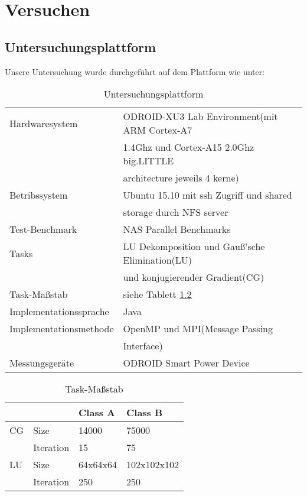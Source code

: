 \chapter{Versuchen}
\label{chap:Versuchen}

\section{Untersuchungsplattform}
\label{sec:Untersuchungsplattform}
Unsere Untersuchung wurde durchgeführt auf dem Plattform wie unter:

\begin{table}[htbp]
\begin{center}
\begin{tabular}{ l | l }
	Hardwaresystem 	& ODROID-XU3 Lab Environment(mit ARM Cortex-A7\\
					& 1.4Ghz und Cortex-A15 2.0Ghz big.LITTLE\\
					& architecture jeweils 4 kerne)\\ \hline
	Betribssystem 	& Ubuntu 15.10 mit ssh Zugriff und shared\\
					& storage durch NFS server\\ \hline
	Test-Benchmark 	& NAS Parallel Benchmarks\\ \hline
	Tasks 			& LU Dekomposition und Gauß'sche Elimination(LU)\\ 
					& und konjugierender Gradient(CG)\\ \hline
	Task-Maßstab	& siehe Tablett \ref{tab:Task-Massstab}\\ \hline
	Implementationssprache 	& Java\\ \hline
	Implementationsmethode 	& OpenMP und MPI(Message Passing\\
							& Interface)\\ \hline
	Messungsgeräte & ODROID Smart Power Device 
\end{tabular}
\end{center}
\label{tab:Untersuchungsplattform}
\caption{Untersuchungsplattform}
\end{table}

\begin{table}[htbp]
\begin{center}
\begin{tabular}{l|l|l|l}
	&			&Class A 	&Class B\\ \hline
CG 	&Size		&14000		&75000\\
	&Iteration	&15			&75\\ \hline
LU 	&Size		&64x64x64	&102x102x102\\
	&Iteration	&250		&250\\
\end{tabular}
\end{center}
\label{tab:Task-Massstab}
\caption{Task-Maßstab}
\end{table}

